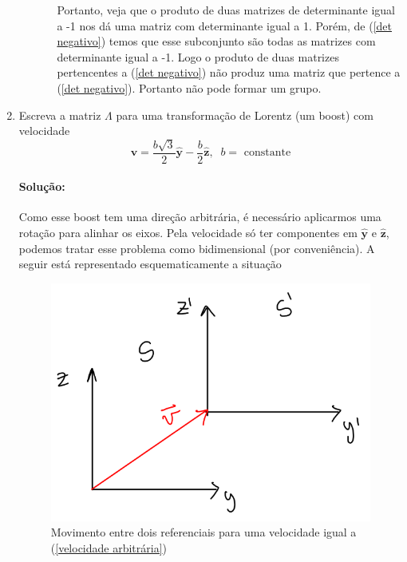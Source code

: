 \documentclass[10pt,a4paper]{article}
\begin{document}
\begin{enumerate}
\begin{enumerate}
\begin{enumerate}
	Portanto, veja que o produto de duas matrizes de determinante igual a -1 nos dá uma matriz com determinante igual a 1. Porém, de (\ref{det negativo}) temos que esse subconjunto são todas as matrizes com determinante igual a -1. Logo o produto de duas matrizes pertencentes a (\ref{det negativo}) não produz uma matriz que pertence a (\ref{det negativo}). Portanto não pode formar um grupo.
	\end{enumerate}
	\end{enumerate}
	
	\item Escreva a matriz $\Lambda$ para uma transformação de Lorentz (um boost) com velocidade 
	\begin{equation}\label{velocidade arbitrária}
	\mathbf{v} = \frac{b\sqrt{3}}{2}\mathbf{\hat{y}}-\frac{b}{2}\mathbf{\hat{z}}, \;\; b = \text{ constante}
	\end{equation}
	
	\paragraph{Solução:} Como esse boost tem uma direção arbitrária, é necessário aplicarmos uma rotação para alinhar os eixos. Pela velocidade só ter componentes em $\mathbf{\hat{y}}$ e $\mathbf{\hat{z}}$, podemos tratar esse problema como bidimensional (por conveniência). A seguir está representado esquematicamente a situação 
	
	\begin{figure}[H]
	\centering
	\includegraphics[scale=0.30]{figuras/boost.png}
	\caption{Movimento entre dois referenciais para uma velocidade igual a (\ref{velocidade arbitrária})}
	\end{figure}
	

\end{enumerate}
\end{document}
